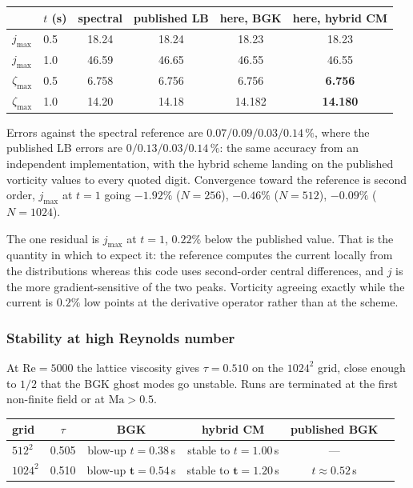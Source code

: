 \documentclass[11pt,a4paper]{article}
\begin{document}
\begin{center}\small
\begin{tabular}{llcccc}
\toprule
 & $t$ (s) & spectral & published LB & here, BGK & here, hybrid CM \\
\midrule
$j_{\max}$    & 0.5 & 18.24 & 18.24 & 18.23 & 18.23 \\
$j_{\max}$    & 1.0 & 46.59 & 46.65 & 46.55 & 46.55 \\
$\zeta_{\max}$& 0.5 & 6.758 & 6.756 & 6.756 & \textbf{6.756} \\
$\zeta_{\max}$& 1.0 & 14.20 & 14.18 & 14.182 & \textbf{14.180} \\
\bottomrule
\end{tabular}
\end{center}

\noindent Errors against the spectral reference are
$0.07 / 0.09 / 0.03 / 0.14\,\%$, where the published LB errors are
$0 / 0.13 / 0.03 / 0.14\,\%$: the same accuracy from an independent
implementation, with the hybrid scheme landing on the published vorticity values
to every quoted digit. Convergence toward the reference is second order, $j_{\max}$
at $t=1$ going $-1.92\%$ ($N=256$), $-0.46\%$ ($N=512$), $-0.09\%$ ($N=1024$).

The one residual is $j_{\max}$ at $t=1$, $0.22\%$ below the published value. That
is the quantity in which to expect it: the reference computes the current locally
from the distributions whereas this code uses second-order central differences,
and $j$ is the more gradient-sensitive of the two peaks. Vorticity agreeing
exactly while the current is $0.2\%$ low points at the derivative operator rather
than at the scheme.

\subsubsection{Stability at high Reynolds number}

At $\mathrm{Re}=5000$ the lattice viscosity gives $\tau=0.510$ on the $1024^2$
grid, close enough to $1/2$ that the BGK ghost modes go unstable. Runs are
terminated at the first non-finite field or at $\mathrm{Ma}>0.5$.

\begin{center}\small
\begin{tabular}{lccccc}
\toprule
grid & $\tau$ & BGK & hybrid CM & published BGK \\
\midrule
$512^2$  & 0.505 & blow-up $t=0.38$\,s & stable to $t=1.00$\,s & --- \\
$1024^2$ & 0.510 & blow-up $\bm{t=0.54}$\,s & stable to $\bm{t=1.20}$\,s & $t\approx0.52$\,s \\
\bottomrule
\end{tabular}
\end{center}
\end{document}
